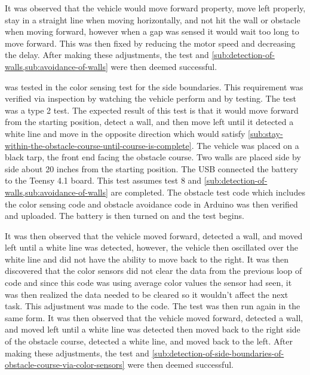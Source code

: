 \documentclass[11pt]{report}
\begin{document}
It was observed that the vehicle would move forward property, move left properly, stay in a straight line when moving horizontally, and not hit the wall or obstacle when moving forward, however when a gap was sensed it would wait too long to move forward. This was then fixed by reducing the motor speed and decreasing the delay. After making these adjustments, the test and \cref{sub:detection-of-walls,sub:avoidance-of-walls} were then deemed successful.

\label{tst:color-sensing-for-side-boundaries}
 was tested in the color sensing test for the side boundaries. This requirement was verified via inspection by watching the vehicle perform and by testing. The test was a type 2 test. The expected result of this test is that it would move forward from the starting position, detect a wall, and then move left until it detected a white line and move in the opposite direction which would satisfy \cref{sub:stay-within-the-obstacle-course-until-course-is-complete}. The vehicle was placed on a black tarp, the front end facing the obstacle course. Two walls are placed side by side about 20 inches from the starting position. The USB connected the battery to the Teensy 4.1 board. This test assumes test 8 and \cref{sub:detection-of-walls,sub:avoidance-of-walls} are completed. The obstacle test code which includes the color sensing code and obstacle avoidance code in Arduino was then verified and uploaded. The battery is then turned on and the test begins.

It was then observed that the vehicle moved forward, detected a wall, and moved left until a white line was detected, however, the vehicle then oscillated over the white line and did not have the ability to move back to the right. It was then discovered that the color sensors did not clear the data from the previous loop of code and since this code was using average color values the sensor had seen, it was then realized the data needed to be cleared so it wouldn’t affect the next task. This adjustment was made to the code. The test was then run again in the same form. It was then observed that the vehicle moved forward, detected a wall, and moved left until a white line was detected then moved back to the right side of the obstacle course, detected a white line, and moved back to the left. After making these adjustments, the test and \cref{sub:detection-of-side-boundaries-of-obstacle-course-via-color-sensors} were then deemed successful.
\end{document}
